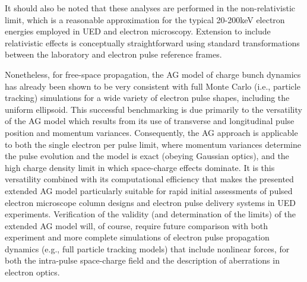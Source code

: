 It should also be noted that these analyses are performed in the non-relativistic limit, which is a reasonable approximation for the typical 20-200keV electron energies employed in UED and electron microscopy.
Extension to include relativistic effects is conceptually straightforward using standard transformations between the laboratory and electron pulse reference frames.

Nonetheless, for free-space propagation, the AG model of charge bunch dynamics has already been shown to be very consistent with full Monte Carlo (i.e., particle tracking) simulations for a wide variety of electron pulse shapes,\cite{michalik_analytic_2006,michalik_evolution_2009} including the uniform ellipsoid.\cite{luiten_how_2004}
This successful benchmarking is due primarily to the versatility of the AG model which results from its use of transverse and longitudinal pulse position and momentum variances.
Consequently, the AG approach is applicable to both the single electron per pulse limit,\cite{lobastov_four-dimensional_2005} where momentum variances determine the pulse evolution and the model is exact (obeying Gaussian optics), and the high charge density limit in which space-charge effects dominate.\cite{luiten_how_2004,siwick_ultrafast_2002,cao_femtosecond_2003}
It is this versatility combined with its computational efficiency that makes the presented extended AG model particularly suitable for rapid initial assessments of pulsed electron microscope column designs and electron pulse delivery systems in UED experiments.
Verification of the validity (and determination of the limits) of the extended AG model will, of course, require future comparison with both experiment and more complete simulations of electron pulse propagation dynamics (e.g., full particle tracking models) that include nonlinear forces, for both the intra-pulse space-charge field and the description of aberrations in electron optics.

